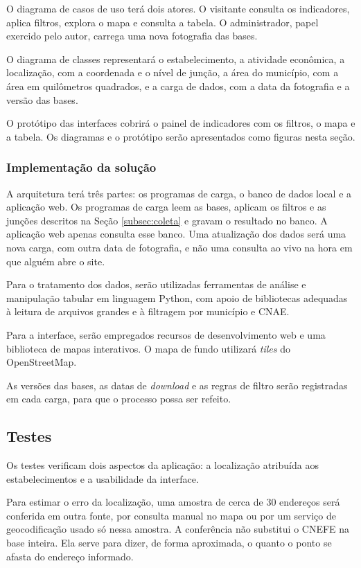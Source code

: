 O diagrama de casos de uso terá dois atores.
O visitante consulta os indicadores, aplica filtros, explora o mapa e consulta a tabela.
O administrador, papel exercido pelo autor, carrega uma nova fotografia das bases.

O diagrama de classes representará o estabelecimento, a atividade econômica, a localização, com a coordenada e o nível de junção, a área do município, com a área em quilômetros quadrados, e a carga de dados, com a data da fotografia e a versão das bases.

O protótipo das interfaces cobrirá o painel de indicadores com os filtros, o mapa e a tabela.
Os diagramas e o protótipo serão apresentados como figuras nesta seção.

\subsubsection{Implementação da solução}

A arquitetura terá três partes: os programas de carga, o banco de dados local e a aplicação web.
Os programas de carga leem as bases, aplicam os filtros e as junções descritos na Seção \ref{subsec:coleta} e gravam o resultado no banco.
A aplicação web apenas consulta esse banco.
Uma atualização dos dados será uma nova carga, com outra data de fotografia, e não uma consulta ao vivo na hora em que alguém abre o site.

Para o tratamento dos dados, serão utilizadas ferramentas de análise e manipulação tabular em linguagem Python, com apoio de bibliotecas adequadas à leitura de arquivos grandes e à filtragem por município e CNAE.

Para a interface, serão empregados recursos de desenvolvimento web e uma biblioteca de mapas interativos.
O mapa de fundo utilizará \textit{tiles} do OpenStreetMap.

As versões das bases, as datas de \textit{download} e as regras de filtro serão registradas em cada carga, para que o processo possa ser refeito.

\subsection{Testes}
\label{subsec:testes}

Os testes verificam dois aspectos da aplicação: a localização atribuída aos estabelecimentos e a usabilidade da interface.

Para estimar o erro da localização, uma amostra de cerca de 30 endereços será conferida em outra fonte, por consulta manual no mapa ou por um serviço de geocodificação usado só nessa amostra.
A conferência não substitui o CNEFE na base inteira.
Ela serve para dizer, de forma aproximada, o quanto o ponto se afasta do endereço informado.

